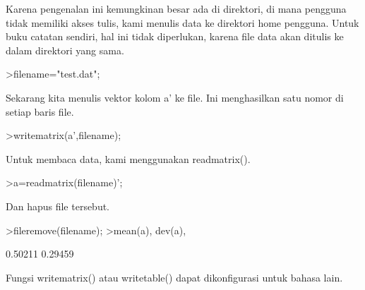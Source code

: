 \documentclass[a4paper,10pt]{article}
\begin{document}
\begin{eulernotebook}
\begin{eulercomment}
\begin{eulercomment}
\begin{eulercomment}
\begin{eulercomment}
\begin{eulercomment}
\begin{eulercomment}
\begin{eulercomment}
\begin{eulercomment}
\begin{eulercomment}
Karena pengenalan ini kemungkinan besar ada di direktori, di mana
pengguna tidak memiliki akses tulis, kami menulis data ke direktori
home pengguna. Untuk buku catatan sendiri, hal ini tidak diperlukan,
karena file data akan ditulis ke dalam direktori yang sama.
\end{eulercomment}
\begin{eulerprompt}
>filename="test.dat";
\end{eulerprompt}
\begin{eulercomment}
Sekarang kita menulis vektor kolom a' ke file. Ini menghasilkan satu
nomor di setiap baris file.
\end{eulercomment}
\begin{eulerprompt}
>writematrix(a',filename);
\end{eulerprompt}
\begin{eulercomment}
Untuk membaca data, kami menggunakan readmatrix().
\end{eulercomment}
\begin{eulerprompt}
>a=readmatrix(filename)';
\end{eulerprompt}
\begin{eulercomment}
Dan hapus file tersebut.
\end{eulercomment}
\begin{eulerprompt}
>fileremove(filename);
>mean(a), dev(a),
\end{eulerprompt}
\begin{euleroutput}
  0.50211
  0.29459
\end{euleroutput}
\begin{eulercomment}
Fungsi writematrix() atau writetable() dapat dikonfigurasi untuk
bahasa lain.


\end{eulercomment}
\end{eulercomment}
\end{eulercomment}
\end{eulercomment}
\end{eulercomment}
\end{eulercomment}
\end{eulercomment}
\end{eulercomment}
\end{eulercomment}
\end{eulernotebook}
\end{document}
